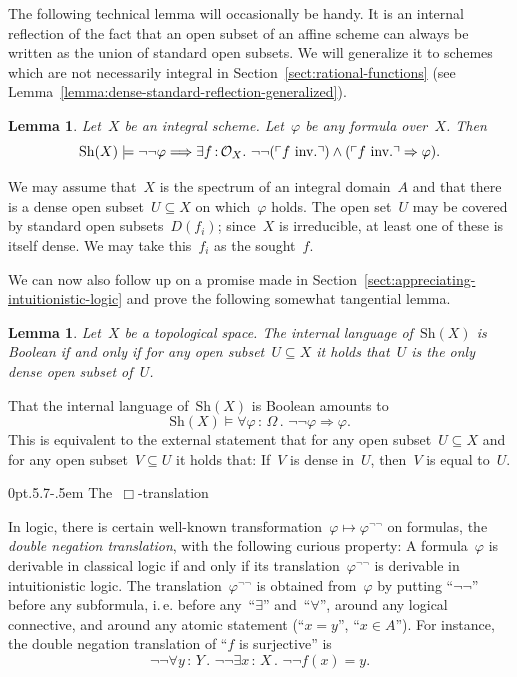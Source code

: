 \documentclass[10pt,reqno,a4paper]{amsbook}
\makeatletter
\theoremstyle{definition}
\theoremstyle{plain}
\newtheorem{lemma}[defn]{Lemma}
\theoremstyle{remark}
\renewcommand{\O}{\mathcal{O}}
\newcommand{\Sh}{\mathrm{Sh}}
\newcommand{\?}{\,{:}\,}
\renewcommand{\_}{\mathpunct{.}\,}
\newcommand{\speak}[1]{\ulcorner\text{\textnormal{#1}}\urcorner}
\newcommand{\ie}{i.\,e.\@\xspace}
\newcommand{\inv}{inv.\@}
\renewenvironment{proof}[1][\proofname]{\par
  \pushQED{\qed}%
  \normalfont \topsep6\p@\@plus6\p@\relax
  \trivlist
  \item[\hskip\labelsep
        \itshape
    #1\@addpunct{.}]\ignorespaces
}{%
  \popQED\endtrivlist\@endpefalse
}
\def\subsection{\@startsection{subsection}{2}%
  {0pt}{.5\linespacing\@plus.7\linespacing}{-.5em}%
  {\normalfont\bfseries}}
\makeatother
\begin{document}
The following technical lemma will occasionally be handy. It is an internal
reflection of the fact that an open subset of an affine scheme can always be
written as the union of standard open subsets. We will generalize it
to schemes which are not necessarily integral in
Section~\ref{sect:rational-functions} (see
Lemma~\ref{lemma:dense-standard-reflection-generalized}).

\begin{lemma}\label{lemma:dense-standard-reflection}
Let~$X$ be an integral scheme. Let~$\varphi$ be any formula
over~$X$. Then
\[ \Sh(X) \models \neg\neg\varphi \Longrightarrow \exists f\?\O_X\_
  \neg\neg(\speak{$f$ \inv}) \wedge (\speak{$f$ \inv} \Rightarrow \varphi). \]
\end{lemma}
\begin{proof}We may assume that~$X$ is the spectrum of an integral domain~$A$
and that there is a dense open subset~$U \subseteq X$ on which~$\varphi$ holds.
The open set~$U$ may be covered by standard open subsets~$D(f_i)$; since~$X$ is
irreducible, at least one of these is itself
dense. We may take this~$f_i$ as the sought~$f$.
\end{proof}

We can now also follow up on a promise made in Section~\ref{sect:appreciating-intuitionistic-logic} and prove the following
somewhat tangential lemma.
\begin{lemma}\label{lemma:boolean-dense}
Let~$X$ be a topological space. The internal language of~$\Sh(X)$ is Boolean if
and only if for any open subset~$U \subseteq X$ it holds that~$U$ is the only
dense open subset of~$U$.
\end{lemma}
\begin{proof}That the internal language of~$\Sh(X)$ is Boolean amounts to
\[ \Sh(X) \models \forall \varphi\?\Omega\_ \neg\neg\varphi \Rightarrow
\varphi. \]
This is equivalent to the external statement that for any open subset~$U
\subseteq X$ and for any open subset~$V \subseteq U$ it holds that: If~$V$ is
dense in~$U$, then~$V$ is equal to~$U$.
\end{proof}


\subsection{\texorpdfstring{The~$\Box$-translation}{The □-translation}}
\label{sect:box-translation}

In logic, there is certain well-known transformation~$\varphi
\mapsto \varphi^{\neg\neg}$ on formulas, the \emph{double negation
translation}, with the following curious property: A formula~$\varphi$ is
derivable in classical logic if and only if its
translation~$\varphi^{\neg\neg}$ is derivable in intuitionistic logic. The
translation~$\varphi^{\neg\neg}$ is obtained from~$\varphi$ by putting
``$\neg\neg$'' before any subformula, \ie before any~``$\exists$''
and~``$\forall$'', around any logical connective, and around any atomic
statement (``$x=y$'', ``$x \in A$''). For instance, the double negation
translation of ``$f$ is surjective'' is
\[ \neg\neg \forall y\?Y\_ \neg\neg \exists x\?X\_ \neg\neg f(x) = y. \]
\end{document}
